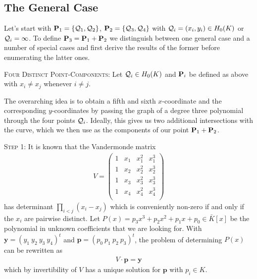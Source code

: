 \documentclass[english,11pt,a4paper]{article}
\begin{document}
\subsection{The General Case}

Let's start with $\P_1 = \{\q_1,\q_2\}$, $\P_2 = \{\q_3,\q_4\}$ with $\q_i = (x_i,y_i) \in \enk$ or $\q_i = \infty$. To define $\P_3 = \P_1 + \P_2$ we distinguish between one general case and a number of special cases and first derive the results of the former before enumerating the latter ones.

\begin{case} {\scshape Four Distinct Point-Components:}
  Let $\q_i \in \enk$ and $\P_i$ be defined as above with $x_i \neq x_j$ whenever $i \neq j$.

  The overarching idea is to obtain a fifth and sixth $x$-coordinate and the corresponding $y$-coordinates by passing the graph of a degree three polynomial through the four points $\q_i$. Ideally, this gives us two additional intersections with the curve, which we then use as the components of our point $\P_1 + \P_2$.

  {\scshape Step 1:} It is known that the Vandermonde matrix
  \begin{align*}V=
    \begin{pmatrix}
      1 & x_1 & x_1^2 & x_1^3\\
      1 & x_2 & x_2^2 & x_2^3\\
      1 & x_3 & x_3^2 & x_3^3\\
      1 & x_4 & x_4^2 & x_4^3\\
    \end{pmatrix}
  \end{align*}
  has determinant $\prod_{i < j} (x_i-x_j)$ which is conveniently non-zero if and only if the $x_i$ are pairwise distinct. Let $P(x) = p_3 x^3 + p_2 x^2 + p_1 x + p_0 \in \bar K[x]$ be the polynomial in unknown coefficients that we are looking for. With $\textbf{y} = (y_1 \ y_2 \ y_3 \ y_4)^t$ and $\textbf{p} = (p_0 \ p_1 \ p_2 \ p_3)^t$, the problem of determining $P(x)$ can be rewritten as
  \begin{align*}
    V \cdot \mathbf{p} = \mathbf{y}
  \end{align*}
  which by invertibility of $V$ has a unique solution for $\mathbf{p}$ with $p_i\in K$.


\end{case}
\end{document}

